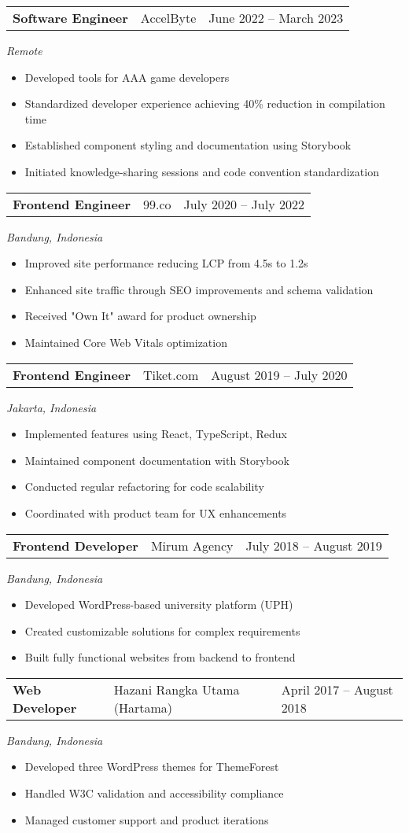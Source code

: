 \documentclass[a4paper, 11pt]{article}
\newcommand{\resumeItem}[1]{
  \item\small{
    {#1 \vspace{-2pt}}
  }
}
\newcommand{\resumeSubheading}[4]{
  \vspace{-2pt}\item
    \begin{tabularx}{0.987\textwidth}[t]{
  >{\raggedright\arraybackslash}X
  >{\centering\arraybackslash}X
  >{\raggedleft\arraybackslash}X }
      \textbf{#1} & #2 & #3 \\
    \end{tabularx}
    \textit{\small#4}\\
    \vspace{-7pt}
}
\newcommand{\resumeItemListStart}{\begin{itemize}[leftmargin=0.22in]}
\newcommand{\resumeItemListEnd}{\end{itemize}\vspace{-20pt}}
\begin{document}
        \resumeSubheading
            {Software Engineer}{AccelByte}{June 2022 -- March 2023}{Remote}
            \resumeItemListStart
                \resumeItem{Developed tools for AAA game developers}
                \resumeItem{Standardized developer experience achieving 40\% reduction in compilation time}
                \resumeItem{Established component styling and documentation using Storybook}
                \resumeItem{Initiated knowledge-sharing sessions and code convention standardization}
            \resumeItemListEnd

        \resumeSubheading
            {Frontend Engineer}{99.co}{July 2020 -- July 2022}{Bandung, Indonesia}
            \resumeItemListStart
                \resumeItem{Improved site performance reducing LCP from 4.5s to 1.2s}
                \resumeItem{Enhanced site traffic through SEO improvements and schema validation}
                \resumeItem{Received "Own It" award for product ownership}
                \resumeItem{Maintained Core Web Vitals optimization}
            \resumeItemListEnd

        \resumeSubheading
            {Frontend Engineer}{Tiket.com}{August 2019 -- July 2020}{Jakarta, Indonesia}
            \resumeItemListStart
                \resumeItem{Implemented features using React, TypeScript, Redux}
                \resumeItem{Maintained component documentation with Storybook}
                \resumeItem{Conducted regular refactoring for code scalability}
                \resumeItem{Coordinated with product team for UX enhancements}
            \resumeItemListEnd

        \resumeSubheading
            {Frontend Developer}{Mirum Agency}{July 2018 -- August 2019}{Bandung, Indonesia}
            \resumeItemListStart
                \resumeItem{Developed WordPress-based university platform (UPH)}
                \resumeItem{Created customizable solutions for complex requirements}
                \resumeItem{Built fully functional websites from backend to frontend}
            \resumeItemListEnd

        \resumeSubheading
            {Web Developer}{Hazani Rangka Utama (Hartama)}{April 2017 -- August 2018}{Bandung, Indonesia}
            \resumeItemListStart
                \resumeItem{Developed three WordPress themes for ThemeForest}
                \resumeItem{Handled W3C validation and accessibility compliance}
                \resumeItem{Managed customer support and product iterations}
            \resumeItemListEnd
\end{document}
